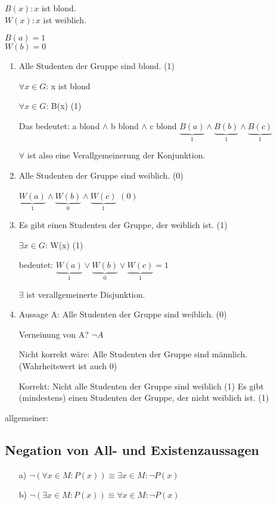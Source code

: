 \documentclass[a4paper, 12pt, twoside] {article}
\newcommand{\attention}{{\fontencoding{U}\fontfamily{futs}\selectfont\char 66\relax}\space}
\begin{document}
$B(x): x$ ist blond. \\
$W(x): x$ ist weiblich.

$B(a) = 1$ \\
$W(b) = 0$

\begin{enumerate}

\item Alle Studenten der Gruppe sind blond. (1)

$\forall x \in G$: x ist blond

$\forall x \in G$: B(x) (1)

Das bedeutet:
a blond $\wedge$ b blond $\wedge$ c blond \newline
$\underbrace{B(a)}_{1} \wedge \underbrace{B(b)}_{1} \wedge \underbrace{B(c)}_{1}$

$\forall$ ist also eine Verallgemeinerung der Konjunktion.

\item Alle Studenten der Gruppe sind weiblich. (0)

$\underbrace{W(a)}_{1} \wedge \underbrace{W(b)}_{0} \wedge \underbrace{W(c)}_{1}$ $(0)$

\item Es gibt einen Studenten der Gruppe, der weiblich ist. (1)

$\exists x \in G$: W(x) (1)

bedeutet: $\underbrace{W(a)}_{1} \lor \underbrace{W(b)}_{0} \lor \underbrace{W(c)}_{1} = 1$

$\exists$ ist verallgemeinerte Disjunktion.

\item Aussage A: Alle Studenten der Gruppe sind weiblich. (0)

Verneinung von A? $\neg A$

\attention Nicht korrekt wäre: Alle Studenten der Gruppe sind männlich. (Wahrheitswert ist auch 0)

Korrekt: Nicht alle Studenten der Gruppe sind weiblich (1)
Es gibt (mindestens) einen Studenten der Gruppe, der nicht weiblich ist. (1)

\end{enumerate}

allgemeiner:

\subsection{Negation von All- und Existenzaussagen}

\begin{itemize}
\item[a)] $\neg (\forall x \in M: P(x)) \equiv \exists x \in M: \neg P(x)$
\item[b)] $\neg (\exists x \in M: P(x)) \equiv \forall x \in M : \neg P(x)$
\end{itemize}
\end{document}

